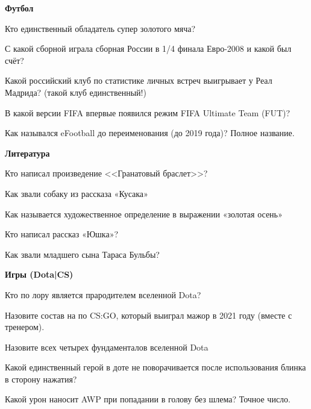 \textbf{\Large Футбол}

Кто единственный обладатель супер золотого мяча?

С какой сборной играла сборная России в 1/4 финала Евро-2008 и какой был счёт?

Какой российский клуб по статистике личных встреч выигрывает у Реал Мадрида? (такой клуб единственный!)

В какой версии FIFA впервые появился режим  FIFA Ultimate Team (FUT)?

Как назывался eFootball до переименования (до 2019 года)? Полное название.

\textbf{\Large Литература}

Кто написал произведение <<Гранатовый браслет>>?

Как звали собаку из рассказа «Кусака»

Как называется художественное определение в выражении «золотая осень»

Кто написал рассказ «Юшка»?

Как звали младшего сына Тараса Бульбы?

\textbf{Игры (Dota|CS)}

Кто по лору является прародителем вселенной Dota?

Назовите состав на по CS:GO, который выиграл мажор в 2021 году (вместе с тренером).

Назовите всех четырех фундаменталов вселенной Dota

Какой единственный герой в доте не поворачивается после использования блинка в сторону нажатия?

Какой урон наносит AWP при попадании в голову без шлема? Точное число.
